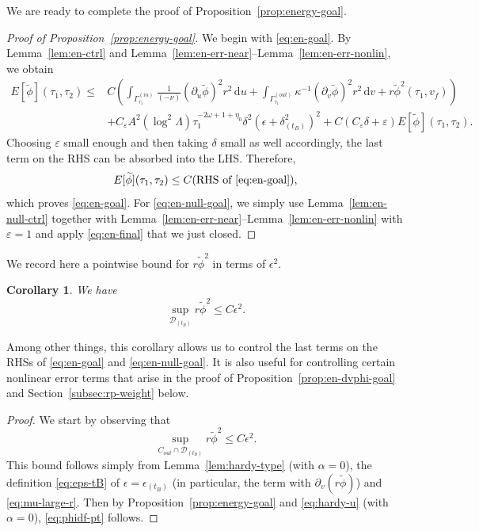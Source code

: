 \documentclass[10pt, reqno]{amsart}
\newtheorem{corollary}[theorem]{Corollary}
\theoremstyle{definition}
\theoremstyle{remark}
\theoremstyle{conjecture}
\numberwithin{equation}{section}
\newcommand{\ud}{\mathrm{d}}
\newcommand{\rd}{\partial}
\newcommand{\0}{\emptyset}
\newcommand{\alp}{\alpha}
\newcommand{\Gmm}{\Gamma}
\newcommand{\dlt}{\delta}
\newcommand{\eps}{\epsilon}
\newcommand{\veps}{\varepsilon}
\newcommand{\kpp}{\kappa}
\newcommand{\Lmb}{\Lambda}
\newcommand{\omg}{\omega}
\newcommand{\calD}{\mathcal D}
\newcommand{\dur}{\nu}
\newcommand{\phibg}{\overline{\phi}}				%
\newcommand{\phidf}{\widetilde{\phi}}				%
\begin{document}
We are ready to complete the proof of Proposition~\ref{prop:energy-goal}.
\begin{proof}[Proof of Proposition~\ref{prop:energy-goal}]
We begin with \eqref{eq:en-goal}. By Lemma~\ref{lem:en-ctrl} and Lemma~\ref{lem:en-err-near}--Lemma~\ref{lem:en-err-nonlin}, we obtain
\begin{align*}
	E[\phidf](\tau_{1}, \tau_{2})
	\leq & C \left( \int_{\Gmm_{\tau_{1}}^{(in)}} \frac{1}{(-\dur)} (\rd_{u} \phidf)^{2} r^{2} \, \ud u 
			+ \int_{\Gmm_{\tau_{1}}^{(out)}} \kpp^{-1} (\rd_{v} \phidf)^{2} r^{2} \, \ud v
			+ r \phidf^{2} (\tau_{1}, v_{f}) \right) \\
		& + C_{\veps} A^{2} (\log^{2} \Lmb) \tau_{1}^{-2 \omg + 1 + \eta_{0}} \dlt^{2} \left(\eps + \dlt_{(t_{B})}^{2} \right)^{2} 
		+ C (C_{\veps} \dlt + \veps) E[\phidf](\tau_{1}, \tau_{2}).
\end{align*}
Choosing $\veps$ small enough and then taking $\dlt$ small as well accordingly, the last term on the RHS can be absorbed into the LHS. Therefore,
\begin{equation} \label{eq:en-final}
	E[\phidf](\tau_{1}, \tau_{2}) \leq C (\hbox{RHS of \eqref{eq:en-goal}}),
\end{equation}
which proves \eqref{eq:en-goal}. For \eqref{eq:en-null-goal}, we simply use Lemma~\ref{lem:en-null-ctrl} together with Lemma~\ref{lem:en-err-near}--Lemma~\ref{lem:en-err-nonlin} with $\veps = 1$ and apply \eqref{eq:en-final} that we just closed. \qedhere
\end{proof}

We record here a pointwise bound for $r \phidf^{2}$ in terms of $\eps^{2}$. 
\begin{corollary} \label{cor:zeroth}
We have
\begin{equation} \label{eq:phidf-pt}
	\sup_{\calD_{(t_B)}} r \phidf^{2} \leq C \eps^{2}.
\end{equation}
\end{corollary}
Among other things, this corollary allows us to control the last terms on the RHSs of \eqref{eq:en-goal} and \eqref{eq:en-null-goal}. It is also useful for controlling certain nonlinear error terms that arise in the proof of Proposition~\ref{prop:en-dvphi-goal} and Section~\ref{subsec:rp-weight} below.
\begin{proof}
We start by observing that
\begin{equation*}
	\sup_{C_{out}\cap\calD_{(t_B)}} r \phidf^{2} \leq C \eps^{2}.
\end{equation*}
This bound follows simply from Lemma~\ref{lem:hardy-type} (with $\alp = 0$), the definition \eqref{eq:eps-tB} of $\eps = \eps_{(t_{B})}$ (in particular, the term with $\rd_{v} (r \phidf)$) and \eqref{eq:mu-large-r}. Then by Proposition~\ref{prop:energy-goal} and \eqref{eq:hardy-u} (with $\alp = 0$), \eqref{eq:phidf-pt} follows. \qedhere
\end{proof}
\end{document}
